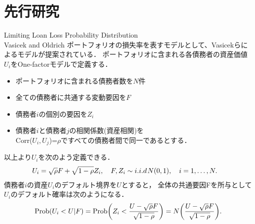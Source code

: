 \documentclass[dvipdfmx]{beamer}
\begin{document}
\section{先行研究}

\begin{frame}{Limiting Loan Loss Probability Distribution\\Vasicek and Oldrich}
ポートフォリオの損失率を表すモデルとして、Vasicekらによるモデルが提案されている．
ポートフォリオに含まれる各債務者の資産価値$U_i$をOne-factorモデルで定義する．\\
\begin{itemize}
\item
ポートフォリオに含まれる債務者数を$N$件
\item
全ての債務者に共通する変動要因を$F$
\item
債務者$i$の個別の要因を$Z_i$
\item
債務者$i$と債務者$j$の相関係数({資産相関})を\\
Corr($U_i,U_j$)=$\rho$ですべての債務者間で同一であるとする．
\end{itemize}
以上より$U_i$を次のよう定義できる．
\begin{eqnarray*}
\label{eq:eq5}
U_{i}=\sqrt{\rho} F+\sqrt {1-\rho}Z_{i}, \hspace{10pt} F,Z_i\sim i.i.d\hspace{1pt} N(0,1),
\hspace{10pt} i=1,\dots,N.\hspace{10pt}
\vspace{-8pt}
\end{eqnarray*}
債務者$i$の資産$U_i$のデフォルト境界を$U$とすると，
全体の共通要因Fを所与として$U_i$のデフォルト確率は次のようになる．
{\small
\begin{eqnarray*}
\label{eq:eq9}
{\rm Prob}(U_i<U|F)={\rm Prob}\biggl(Z_i<\frac{U-\sqrt{\rho}F}{\sqrt{1-\rho}}\biggr)=
N\biggl(\frac{U-\sqrt{\rho}F}{\sqrt{1-\rho}}\biggr).
\end{eqnarray*}
}
\end{frame}
\end{document}
